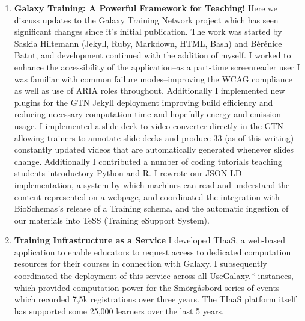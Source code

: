 \begin{enumerate}[label=\ref*{chapter:training}.\arabic*]
\itemsep-0.5em
\setcounter{enumi}{-1}

\item \textbf{\color{hexy-red}Galaxy Training: A Powerful Framework for Teaching!} Here we discuss updates to the Galaxy Training Network project which has seen significant changes since it's initial publication. The work was started by Saskia Hiltemann (Jekyll, Ruby, Markdown, HTML, Bash) and Bérénice Batut, and development continued with the addition of myself. I worked to enhance the accessibility of the application--as a part-time screenreader user I was familiar with common failure modes--improving the WCAG compliance as well as use of ARIA roles throughout. Additionally I implemented new plugins for the GTN Jekyll deployment improving build efficiency and reducing necessary computation time and hopefully energy and emission usage. I implemented a slide deck to video converter directly in the GTN allowing trainers to annotate slide decks and produce 33 (as of this writing) constantly updated videos that are automatically generated whenever slides change. Additionally I contributed a number of coding tutorials teaching students introductory Python and R. I rewrote our JSON-LD implementation, a system by which machines can read and understand the content represented on a webpage, and coordinated the integration with BioSchemas's release of a Training schema, and the automatic ingestion of our materials into TeSS (Training eSupport System).

\item \textbf{\color{hexy-red}Training Infrastructure as a Service} I developed TIaaS, a web-based application to enable educators to request access to dedicated computation resources for their courses in connection with Galaxy. I subsequently coordinated the deployment of this service across all UseGalaxy.* instances, which provided computation power for the Smörgåsbord series of events which recorded 7,5k registrations over three years. The TIaaS platform itself has supported some 25,000 learners over the last 5 years.


\end{enumerate}

